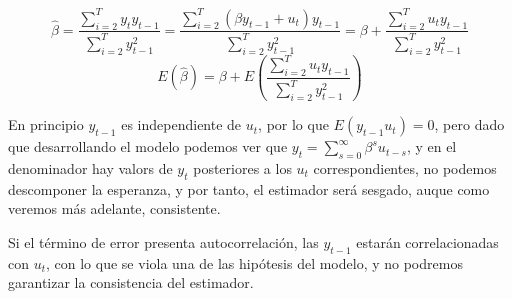 \[\hat{\beta}=\dfrac{\sum_{i=2}^Ty_ty_{t-1}}{\sum_{i=2}^Ty_{t-1}^2}=\dfrac{\sum_{i=2}^T(\beta y_{t-1}+u_t)y_{t-1}}{\sum_{i=2}^Ty_{t-1}^2}=\beta+\dfrac{\sum_{i=2}^Tu_ty_{t-1}}{\sum_{i=2}^Ty_{t-1}^2}\]
\[E(\hat{\beta})=\beta+E\left(\dfrac{\sum_{i=2}^Tu_ty_{t-1}}{\sum_{i=2}^Ty_{t-1}^2}\right)\]

En principio $y_{t-1}$ es independiente de $u_t$, por lo que $E(y_{t-1}u_t)=0$, pero dado que desarrollando el modelo podemos ver que $y_t=\sum_{s=0}^{\infty}\beta^su_{t-s}$, y en el denominador hay valors de $y_t$ posteriores a los $u_t$ correspondientes, no podemos descomponer la esperanza, y por tanto, el estimador ser\'a sesgado, auque como veremos m\'as adelante, consistente.

Si el t\'ermino de error presenta autocorrelaci\'on, las $y_{t-1}$ estar\'an correlacionadas con $u_t$, con lo que se viola una de las hip\'otesis del modelo, y no podremos garantizar la consistencia del estimador.


